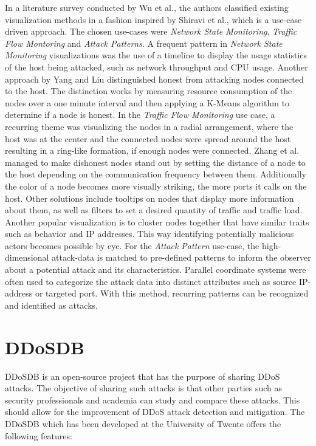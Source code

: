 In a literature survey conducted by Wu et al.\cite{wu}, the authors classified existing visualization methods in a fashion inspired by Shiravi et al.\cite{shiravi}, which is a use-case driven approach. The chosen use-cases were \textit{Network State Monitoring}, \textit{Traffic Flow Montoring} and \textit{Attack Patterns}. A frequent pattern in \textit{Network State Monitoring} visualizations was the use of a timeline to display the usage statistics of the host being attacked, such as network throughput and CPU usage\cite{chen, lee}. Another approach by Yang and Liu\cite{yang} distinguished honest from attacking nodes connected to the host. The distinction works by measuring resource consumption of the nodes over a one minute interval and then applying a K-Means algorithm to determine if a node is honest. 
In the \textit{Traffic Flow Monitoring} use case, a recurring theme was visualizing the nodes in a radial arrangement\cite{zhangRadial, pearlman, barbosa}, where the host was at the center and the connected nodes were spread around the host resulting in a ring-like formation, if enough nodes were connected. Zhang et al.\cite{zhangRadial} managed to make dishonest nodes stand out by setting the distance of a node to the host depending on the communication frequency between them. Additionally the color of a node becomes more visually striking, the more ports it calls on the host. Other solutions include tooltips on nodes that display more information about them, as well as filters to set a desired quantity of traffic and traffic load\cite{barbosa}. Another popular visualization is to cluster nodes together that have similar traits such as behavior and IP addresses\cite{zhangCluster}. This way identifying potentially malicious actors becomes possible by eye.
For the \textit{Attack Pattern} use-case, the high-dimensional attack-data is matched to pre-defined patterns to inform the observer about a potential attack and its characteristics\cite{wu}. Parallel coordinate systems were often used to categorize the attack data into distinct attributes such as source IP-address or targeted port\cite{choi, lee, okada}. With this method, recurring patterns can be recognized and identified as attacks.


\section{DDoSDB}\label{ddosdb}
DDoSDB is an open-source project that has the purpose of sharing DDoS attacks. The objective of sharing such attacks is that other parties such as security professionals and academia can study and compare these attacks. This should allow for the improvement of DDoS attack detection and mitigation\cite{ddosdb}.
The DDoSDB which has been developed at the University of Twente offers the following features:

